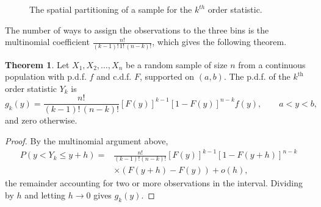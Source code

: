 \documentclass[12pt,a4paper]{report}
\theoremstyle{definition}
\newtheorem{thm}{Theorem}[section]
\theoremstyle{plain}
\begin{document}
\begin{figure}[H]
\centering
{}\caption{The spatial partitioning of a sample for the $k^{th}$ order statistic.}
\end{figure}

The number of ways to assign the observations to the three bins is the
multinomial coefficient $\frac{n!}{(k - 1)!\,1!\,(n - k)!}$, which gives the
following theorem.

\begin{thm}
\label{thm:orderk}
Let $X_1, X_2, \dots, X_n$ be a random sample of size $n$ from a continuous
population with p.d.f. $f$ and c.d.f. $F$, supported on $(a, b)$. The p.d.f. of
the $k^{\text{th}}$ order statistic $Y_k$ is
\[ g_k(y) = \frac{n!}{(k - 1)!\,(n - k)!} [F(y)]^{k-1} [1 - F(y)]^{n - k} f(y)
,\qquad a < y < b ,\]
and zero otherwise.
\end{thm}

\begin{proof}
By the multinomial argument above,
\begin{align*}
P(y<Y_k\leq y + h) ={}& \frac{n!}{(k - 1)!(n - k)!}[F(y)]^{k-1}[1 - F(y + h)]^{n-k}\\
&\times\left(F(y + h) - F(y)\right) + o(h),
\end{align*}
the remainder accounting for two or more observations in the interval. Dividing by $h$ and letting $h\to 0$ gives
$g_k(y)$.
\end{proof}
\end{document}
